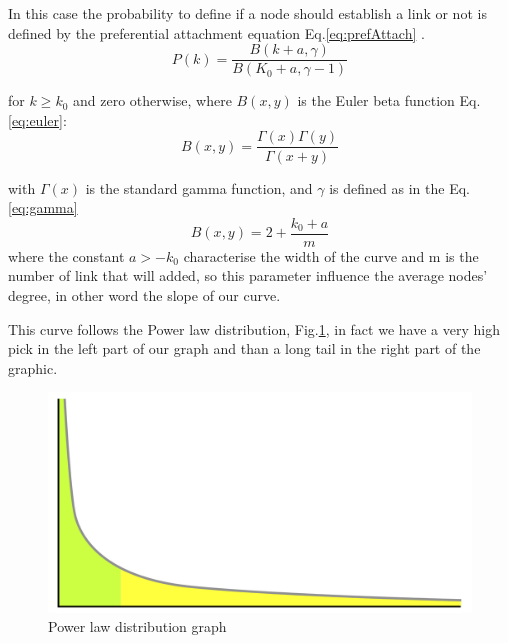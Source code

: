         In this case the probability to define if a node should establish a link or not is defined by the preferential attachment equation Eq.\ref{eq:prefAttach} \cite{wiky-prefAttach}.
        \begin{equation}\label{eq:prefAttach}
          P(k) = \frac{B(k+a,\gamma)}{B(K_0 + a, \gamma - 1)}
        \end{equation}
        
        for $k \geq k_0$ and zero otherwise, where $B(x,y)$ is the Euler beta function Eq.\ref{eq:euler}:
        \begin{equation}\label{eq:euler}
          B(x,y) = \frac{\Gamma(x)\Gamma(y)}{\Gamma(x+y)}
        \end{equation}
        
        with $\Gamma(x)$ is the standard gamma function, and $\gamma$ is defined as in the  Eq.\ref{eq:gamma}
        \begin{equation}\label{eq:gamma}
          B(x,y) = 2+ \frac{k_0+a}{m}
        \end{equation}
        where the constant $a > -k_0$ characterise the width of the curve and m is the number of link that will added, so this parameter influence the average nodes' degree, in other word the slope of our curve.
        
        This curve follows the Power law distribution, Fig.\ref{fig:PowerLaw}, in fact we have a very high pick in the left part of our graph and than a long tail in the right part of the graphic.
      
        \begin{figure}[t]
            \centering
            \includegraphics[width=\linewidth]{Figure/PowerLaw.png}
            \caption{Power law distribution graph}
            \label{fig:PowerLaw}
        \end{figure}
        
